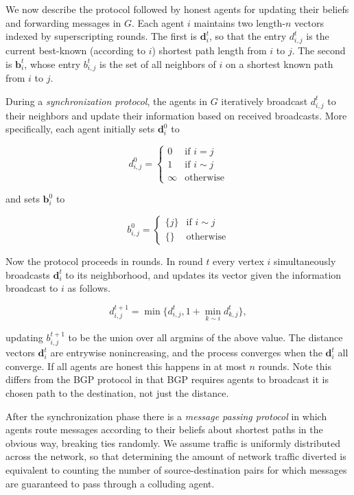 \documentclass[prodmode,acmec]{ec-acmsmall}
\begin{document}
We now describe the protocol followed by honest agents for updating their
beliefs and forwarding messages in $G$. Each agent $i$ maintains two length-$n$
vectors indexed by superscripting rounds. The first is $\mathbf{d}_i^t$, so
that the entry $d_{i,j}^t$ is the current best-known (according to $i$)
shortest path length from $i$ to $j$. The second is $\mathbf{b}_i^t$, whose
entry $b_{i,j}^t$ is the set of all neighbors of $i$ on a shortest known path
from $i$ to $j$. 

During a \emph{synchronization protocol}, the agents in $G$ iteratively
broadcast $d_{i,j}^t$ to their neighbors and update their information based on
received broadcasts. More specifically, each agent initially sets
$\mathbf{d}_i^0$ to

\[
   d_{i,j}^0 =
    \begin{cases}
        0 & \text{if } i = j \\
        1 & \text{if } i \sim j \\
        \infty & \text{otherwise}
    \end{cases}
\]

and sets $\mathbf{b}_i^0$ to

\[
   b_{i,j}^0 =
    \begin{cases}
        \{ j \} & \text{if } i \sim j \\
        \{ \} & \text{otherwise}
    \end{cases}
\]

Now the protocol proceeds in rounds. In round $t$ every vertex $i$
simultaneously broadcasts $\mathbf{d}_i^t$ to its neighborhood, and 
updates its vector given the information broadcast to $i$ as follows.

\[
   d_{i,j}^{t+1} = \min \{ d_{i,j}^t, 1 + \min_{k \sim i} d_{k,j}^t \},
\]

updating $b_{i,j}^{t+1}$ to be the union over all argmins of the above value.
The distance vectors $\mathbf{d}_i^t$ are entrywise nonincreasing, and the
process converges when the $\mathbf{d}_i^t$ all converge. If all agents
are honest this happens in at most $n$ rounds. Note this differs from the BGP
protocol in that BGP requires agents to broadcast it is chosen path to the
destination, not just the distance.

After the synchronization phase there is a \emph{message passing protocol} in
which agents route messages according to their beliefs about shortest paths in
the obvious way, breaking ties randomly. We assume traffic is uniformly
distributed across the network, so that determining the amount of network
traffic diverted is equivalent to counting the number of source-destination
pairs for which messages are guaranteed to pass through a colluding agent. 
\end{document}
